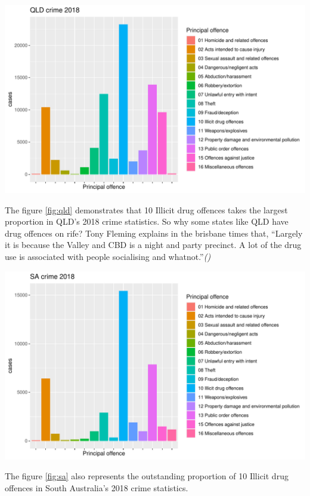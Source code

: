 \documentclass[11pt,a4paper,]{article}
\let\origfigure\figure
\let\endorigfigure\endfigure
\renewenvironment{figure}[1][2] {
\expandafter\origfigure\expandafter[H]
} {
\endorigfigure
}
\begin{document}
\begin{figure}
\centering
\includegraphics{ETC5513-Assignment4_files/figure-latex/qld-1.pdf}
\caption{\label{fig:qld}QLD crime 2018}
\end{figure}

The figure \ref{fig:qld} demonstrates that 10 Illicit drug offences takes the largest proportion in QLD's 2018 crime statistics. So why some states like QLD have drug offences on rife? Tony Fleming explains in the brisbane times that, ``Largely it is because the Valley and CBD is a night and party precinct. A lot of the drug use is associated with people socialising and whatnot.''\emph{(\textcite{brisbanetimes2019})}

\begin{figure}
\centering
\includegraphics{ETC5513-Assignment4_files/figure-latex/sa-1.pdf}
\caption{\label{fig:sa}SA crime 2018}
\end{figure}

The figure \ref{fig:sa} also represents the outstanding proportion of 10 Illicit drug offences in South Australia's 2018 crime statistics.
\end{document}
